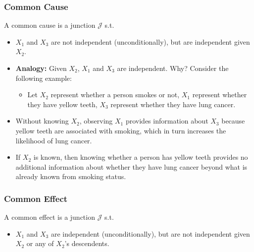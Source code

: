 \subsubsection{Common Cause}
\begin{definition}
    A common cause is a junction $\mathcal{J}$ s.t.
    \begin{itemize}
        \item $X_1$ and $X_3$ are not independent (unconditionally), but are independent given $X_2$.
    \end{itemize}
\end{definition}

\begin{notes}
    \begin{itemize}
        \item \textbf{Analogy:} Given $X_2$, $X_1$ and $X_3$ are independent. Why? Consider the following example:
        \begin{itemize}
            \item Let $X_2$ represent whether a person smokes or not, $X_1$ represent whether they have yellow teeth, $X_3$ represent whether they have lung cancer.
        \end{itemize}
        \item Without knowing $X_2$, observing $X_1$ provides information about $X_3$ because yellow teeth are associated with smoking, which in turn increases the likelihood of lung cancer. 
        \item If $X_2$ is known, then knowing whether a person has yellow teeth provides no additional information about whether they have lung cancer beyond what is already known from smoking status. 
    \end{itemize}
\end{notes}


\subsubsection{Common Effect}
\begin{definition}
    A common effect is a junction $\mathcal{J}$ s.t.
    \begin{itemize}
        \item $X_1$ and $X_3$ are independent (unconditionally), but are not independent given $X_2$ or any of $X_2$'s descendents.
    \end{itemize}
\end{definition}

